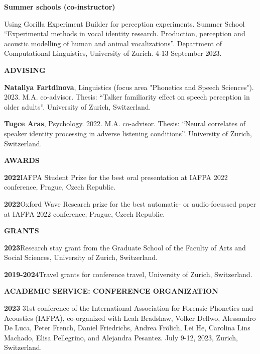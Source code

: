 \documentclass[11pt]{article}
\newcommand{\hangpara}{
 \setlength{\parindent}{0in} %
 \hangindent=0.42in %
}
\begin{document}
\begin{flushleft}
{\bf Summer schools (co-instructor)}
\end{flushleft}
\hangpara Using Gorilla Experiment Builder for perception experiments. Summer School “Experimental methods in vocal identity research. Production, perception and acoustic modelling of human and animal vocalizations”. Department of Computational Linguistics, University of Zurich. 4-13 September 2023.




\vskip 20pt
\begin{flushleft}
{\bf ADVISING}
\end{flushleft}
\hangpara \textbf{Nataliya Fartdinova}, Linguistics (focus area "Phonetics and Speech Sciences"). 2023. M.A. co-advisor. Thesis: “Talker familiarity effect on speech perception in older adults”. University of Zurich, Switzerland.
\vskip 6pt
\hangpara \textbf{Tugce Aras}, Psychology. 2022. M.A. co-advisor. Thesis: “Neural correlates of speaker identity processing in adverse listening conditions”. University of Zurich, Switzerland.




\vskip 20pt
\begin{flushleft}
{\bf AWARDS}
\end{flushleft}
\hangpara
{\bf 2022}\hspace{1ex}IAFPA Student Prize for the best oral presentation at IAFPA 2022 conference, Prague, Czech Republic.
\vskip 6pt
\hangpara
{\bf 2022}\hspace{1ex}Oxford Wave Research prize for the best automatic- or audio-focussed paper at IAFPA 2022 conference; Prague, Czech Republic. %




\vskip 20pt
\begin{flushleft}
{\bf GRANTS}
\end{flushleft}
\hangpara
{\bf 2023}\hspace{1ex}Research stay grant from the Graduate School of the Faculty of Arts and Social Sciences, University of Zurich, Switzerland. %
\vskip 6pt
\hangpara
{\bf 2019-2024}\hspace{1ex}Travel grants for conference travel, University of Zurich, Switzerland. %




\vskip 20pt
\begin{flushleft}
{\bf ACADEMIC SERVICE: CONFERENCE ORGANIZATION}
\end{flushleft}
\hangpara
{\bf 2023}\hspace{1ex} 31st conference of the International Association for Forensic Phonetics and Acoustics (IAFPA), co-organized with Leah Bradshaw, Volker Dellwo, Alessandro De Luca, Peter French, Daniel Friedrichs, Andrea Frölich, Lei He, Carolina Lins Machado, Elisa Pellegrino, and Alejandra Pesantez. July 9-12, 2023, Zurich, Switzerland.
\end{document}
